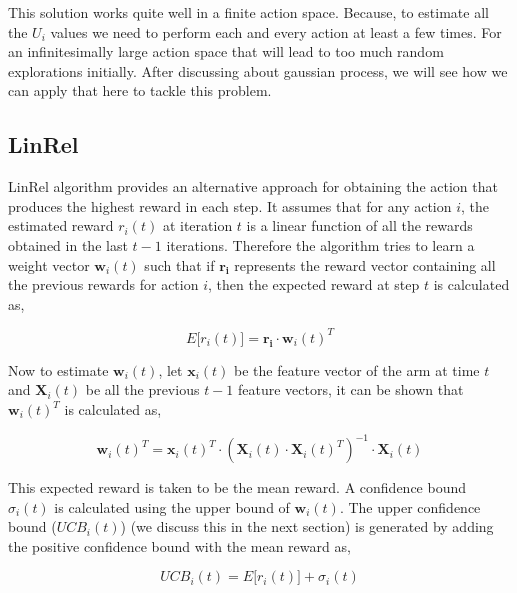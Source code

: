 \documentclass[english]{tktltiki}
\begin{document}
This solution works quite well in a finite action space. Because, to estimate all the $U_i$ values we need to perform each and every action at least a few times. For an infinitesimally large action space that will lead to too much random explorations initially. After discussing about gaussian process, we will see how we can apply that here to tackle this problem.

\subsection{LinRel}

LinRel algorithm \cite{linrel} provides an alternative approach for obtaining the action that produces the highest reward in each step. It assumes that for any action $i$, the estimated reward $r_i(t)$ at iteration $t$ is a linear function of all the rewards obtained in the last $t-1$ iterations. Therefore the algorithm tries to learn a weight vector $\mathbf{w}_i(t)$ such that if $\mathbf{r_i}$ represents the reward vector containing all the previous rewards for action $i$, then the expected reward at step $t$ is calculated as,

\begin{equation}
E\big[r_i(t)\big] = \mathbf{r_i} \cdot \mathbf{w}_i(t)^T
\end{equation}

Now to estimate $\mathbf{w}_i(t)$, let $\mathbf{x}_i(t)$ be the feature vector of the arm at time $t$ and $\mathbf{X}_i(t)$ be all the previous $t-1$ feature vectors, it can be shown that $\mathbf{w}_i(t)^T$ is calculated as,

\begin{equation}
\mathbf{w}_i(t)^T = \mathbf{x}_i(t)^T \cdot (\mathbf{X}_i(t) \cdot \mathbf{X}_i(t)^T)^{-1} \cdot \mathbf{X}_i(t)
\end{equation}


This expected reward is taken to be the mean reward. A confidence bound $\sigma_i(t)$ is calculated using the upper bound of $\mathbf{w}_i(t)$. The upper confidence bound ($UCB_i(t)$) \cite{ucb} (we discuss this in the next section) is generated by adding the positive confidence bound with the mean reward as,

\begin{equation}
UCB_i(t) = E\big[r_i(t)\big] + \sigma_i(t)
\end{equation}
\end{document}
